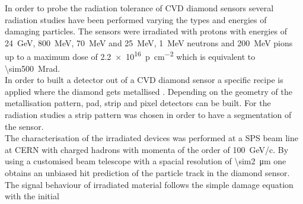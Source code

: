 In order to probe the radiation tolerance of \ac{CVD} diamond sensors several radiation studies have been performed varying the types and energies of damaging particles. The sensors were irradiated with protons with energies of \SI{24}{\giga\electronvolt}, \SI{800}{\mega\electronvolt}, \SI{70}{\mega\electronvolt} and \SI{25}{\mega\electronvolt}, \SI{1}{\mega\electronvolt} neutrons and \SI{200}{\mega\electronvolt} pions up to a maximum dose of \SI{2.2e16}{p\per\centi\meter^2} which is equivalent to \SI{\sim500}{\mega rad}.\\
In order to built a detector out of a \ac{CVD} diamond sensor a specific recipe is applied where the diamond gets metallised \cite{sussmann}. Depending on the geometry of the metallisation pattern, pad, strip and pixel detectors can be built. For the radiation studies a strip pattern was chosen in order to have a segmentation of the sensor.\\ 
The characterisation of the irradiated devices was performed at a \ac{SPS} beam line at CERN with charged hadrons with momenta of the order of \SI{100}{\giga\electronvolt/c}. By using a customised beam telescope with a spacial resolution of \SI{\sim2}{\micro\meter} one obtains an unbiased hit prediction of the particle track in the diamond sensor.\\
The signal behaviour of irradiated material follows the simple damage equation with the initial 

